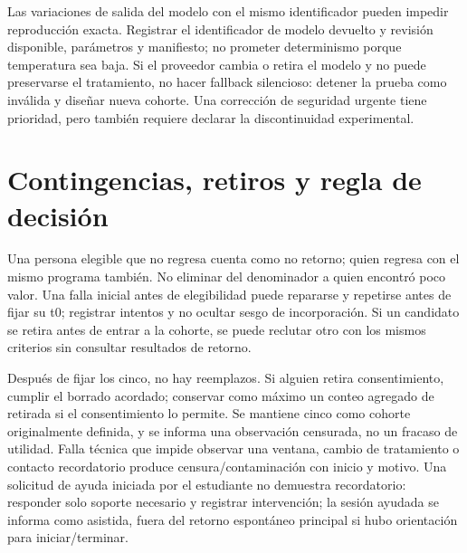 \documentclass[11pt,a4paper]{report}
\begin{document}
Las variaciones de salida del modelo con el mismo identificador pueden impedir reproducción exacta. Registrar el identificador de modelo devuelto y revisión disponible, parámetros y manifiesto; no prometer determinismo porque temperatura sea baja. Si el proveedor cambia o retira el modelo y no puede preservarse el tratamiento, no hacer fallback silencioso: detener la prueba como inválida y diseñar nueva cohorte. Una corrección de seguridad urgente tiene prioridad, pero también requiere declarar la discontinuidad experimental.

\section{Contingencias, retiros y regla de decisión}
Una persona elegible que no regresa cuenta como no retorno; quien regresa con el mismo programa también. No eliminar del denominador a quien encontró poco valor. Una falla inicial antes de elegibilidad puede repararse y repetirse antes de fijar su t0; registrar intentos y no ocultar sesgo de incorporación. Si un candidato se retira antes de entrar a la cohorte, se puede reclutar otro con los mismos criterios sin consultar resultados de retorno.

Después de fijar los cinco, no hay reemplazos. Si alguien retira consentimiento, cumplir el borrado acordado; conservar como máximo un conteo agregado de retirada si el consentimiento lo permite. Se mantiene cinco como cohorte originalmente definida, y se informa una observación censurada, no un fracaso de utilidad. Falla técnica que impide observar una ventana, cambio de tratamiento o contacto recordatorio produce censura/contaminación con inicio y motivo. Una solicitud de ayuda iniciada por el estudiante no demuestra recordatorio: responder solo soporte necesario y registrar intervención; la sesión ayudada se informa como asistida, fuera del retorno espontáneo principal si hubo orientación para iniciar/terminar.
\end{document}
